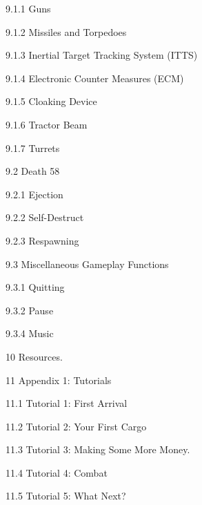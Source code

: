 \documentclass{article}
\begin{document}
9.1.1 Guns    



9.1.2 Missiles and Torpedoes  



9.1.3 Inertial Target Tracking System (ITTS)   



9.1.4 Electronic Counter Measures (ECM) 



9.1.5 Cloaking Device  



9.1.6 Tractor Beam 



9.1.7 Turrets 



9.2 Death 58 



9.2.1 Ejection 



9.2.2 Self-Destruct 



9.2.3 Respawning



9.3 Miscellaneous Gameplay Functions



9.3.1 Quitting 



9.3.2 Pause 



9.3.4 Music



10 Resources. 



11 Appendix 1: Tutorials  



11.1 Tutorial 1: First Arrival 



11.2 Tutorial 2: Your First Cargo 



11.3 Tutorial 3: Making Some More Money. 



11.4 Tutorial 4: Combat



11.5 Tutorial 5: What Next? 
\end{document}
